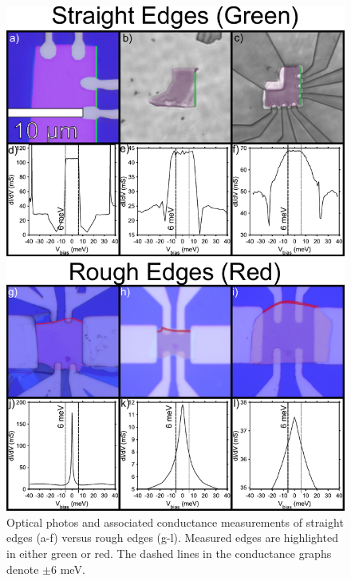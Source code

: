 \begin{figure}
	\centering
	\includegraphics[scale = 0.75]{Chap4/Figures/StraightVsRough.pdf}
	\caption{Optical photos and associated conductance measurements of straight edges (a-f) versus rough edges (g-l). Measured edges are highlighted in either green or red. The dashed lines in the conductance graphs denote $\pm$6 meV.}
	\label{fig:StraightVsNormal}
\end{figure}
